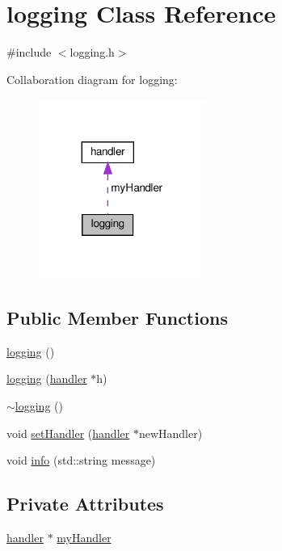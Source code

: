 \hypertarget{classlogging}{}\section{logging Class Reference}
\label{classlogging}


{\ttfamily \#include $<$logging.\+h$>$}



Collaboration diagram for logging\+:\nopagebreak
\begin{figure}[H]
\begin{center}
\leavevmode
\includegraphics[width=155pt]{d7/d7f/classlogging__coll__graph}
\end{center}
\end{figure}
\subsection*{Public Member Functions}
\begin{DoxyCompactItemize}
\item 
\hyperlink{classlogging_a9fc3278b328fdec4922315d85f772489}{logging} ()
\item 
\hyperlink{classlogging_a38300200148601f298e30b8a84ad686c}{logging} (\hyperlink{classhandler}{handler} $\ast$h)
\item 
\hyperlink{classlogging_aa50e430d72fd366e7f906b61242c658f}{$\sim$logging} ()
\item 
void \hyperlink{classlogging_a3df699bc82c58695050e68f28fa4bf39}{set\+Handler} (\hyperlink{classhandler}{handler} $\ast$new\+Handler)
\item 
void \hyperlink{classlogging_aa15fabd099ea702ad39a8bb82e56d56c}{info} (std\+::string message)
\end{DoxyCompactItemize}
\subsection*{Private Attributes}
\begin{DoxyCompactItemize}
\item 
\hyperlink{classhandler}{handler} $\ast$ \hyperlink{classlogging_a0bd664aa980c8b51e8ebd84c5f6a3901}{my\+Handler}
\end{DoxyCompactItemize}


